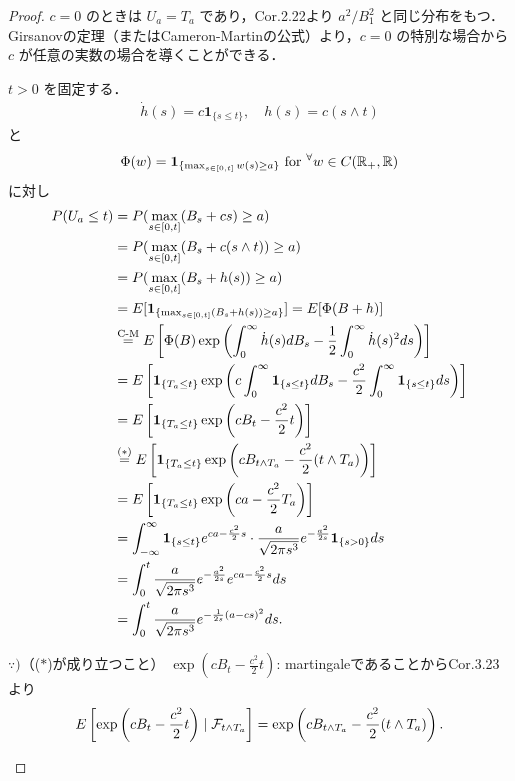 \documentclass{jsarticle}
\begin{document}
\begin{proof}
    $c=0$ のときは $U_a=T_a$ であり，Cor.2.22より $a^2/B_1^2$ と同じ分布をもつ．
    Girsanovの定理（またはCameron-Martinの公式）より，$c=0$ の特別な場合から $c$ が任意の実数の場合を導くことができる．
    
    $t>0$ を固定する．
    \begin{align}
        \dot{h}(s)=c\bm{1}_{\{s\le t\}},\quad
        h(s)=c(s\wedge t)
    \end{align}
    と
    \begin{align}
        \Phi(w)=\bm{1}_{\{\max_{s\in[0,t]}w(s)\ge a\}}\text{ for }{}^{\forall} w\in C(\mathbb{R}_+,\mathbb{R})
    \end{align}
    に対し
    \begin{align}
        P(U_a\le t)
        &= P(\max_{s\in[0,t]}(B_s+cs)\ge a) \\
        &= P(\max_{s\in[0,t]}(B_s+c(s\wedge t))\ge a) \\
        &= P(\max_{s\in[0,t]}(B_s+h(s))\ge a) \\
        &= E[\bm{1}_{\{\max_{s\in[0,t]}(B_s+h(s))\ge a\}}]
        = E[\Phi(B+h)] \\
        &\stackrel{\text{C-M}}{=} E\left[\Phi(B)\exp\left(\int_0^\infty \dot{h}(s)dB_s-\frac{1}{2}\int_0^\infty \dot{h}(s)^2 ds\right)\right] \\
        &= E\left[\bm{1}_{\{T_a\le t\}}\exp\left(c\int_0^\infty \bm{1}_{\{s\le t\}}dB_s-\frac{c^2}{2}\int_0^\infty \bm{1}_{\{s\le t\}} ds\right)\right] \\
        &= E\left[\bm{1}_{\{T_a\le t\}}\exp\left(cB_t-\frac{c^2}{2}t\right)\right] \\
        &\stackrel{(\ast)}{=} E\left[\bm{1}_{\{T_a\le t\}}\exp\left(cB_{t\wedge T_a}-\frac{c^2}{2}(t\wedge T_a)\right)\right] \\
        &= E\left[\bm{1}_{\{T_a\le t\}}\exp\left(ca-\frac{c^2}{2}T_a\right)\right] \\
        &= \int_{-\infty}^{\infty} \bm{1}_{\{s\le t\}}e^{ca-\frac{c^2}{2}s}\cdot\frac{a}{\sqrt{2\pi s^3}}e^{-\frac{a^2}{2s}}\bm{1}_{\{s>0\}}ds \\
        &= \int_0^t \frac{a}{\sqrt{2\pi s^3}}e^{-\frac{a^2}{2s}}e^{ca-\frac{c^2}{2}s}ds \\
        &= \int_0^t \frac{a}{\sqrt{2\pi s^3}}e^{-\frac{1}{2s}(a-cs)^2}ds.
    \end{align}
    
    \begin{screen}
        $\because)$（($\ast$)が成り立つこと）
        $\exp\left(cB_t-\frac{c^2}{2}t\right)$: martingaleであることからCor.3.23より
        \begin{align}
            E\left[\exp\left(cB_t-\frac{c^2}{2}t\right)\mid\mathcal{F}_{t\wedge T_a}\right]
            = \exp\left(cB_{t\wedge T_a}-\frac{c^2}{2}(t\wedge T_a)\right).
        \end{align}
    \end{screen}
    

\end{proof}
\end{document}
